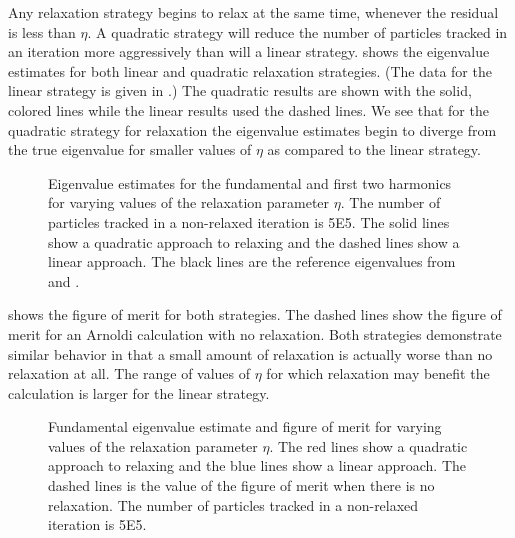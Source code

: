 Any relaxation strategy begins to relax at the same time, whenever the residual is less than $\eta$.  A quadratic strategy will reduce the number of particles tracked in an iteration more aggressively than will a linear strategy.   shows the eigenvalue estimates for both linear and quadratic relaxation strategies.  (The data for the linear strategy is given in .)  The quadratic results are shown with the solid, colored lines while the linear results used the dashed lines.  We see that for the quadratic strategy for relaxation the eigenvalue estimates begin to diverge from the true eigenvalue for smaller values of $\eta$ as compared to the linear strategy.  
\begin{sidewaysfigure}\centering
    
    \caption{Eigenvalue estimates for the fundamental and first two harmonics for varying values of the relaxation parameter $\eta$.  The number of particles tracked in a non-relaxed iteration is 5E5.  The solid lines show a quadratic approach to relaxing and the dashed lines show a linear approach.  The black lines are the reference eigenvalues from \cite{Garis:1991One-s-0} and \cite{Dahl:1979Eigen-0}.}
    \label{fig:MoreandLessValue}
\end{sidewaysfigure}

 shows the figure of merit for both strategies.  The dashed lines show the figure of merit for an Arnoldi calculation with no relaxation.  Both strategies demonstrate similar behavior in that a small amount of relaxation is actually worse than no relaxation at all.  The range of values of $\eta$ for which relaxation may benefit the calculation is larger for the linear strategy.  


\begin{sidewaysfigure}\centering
    
    \caption{Fundamental eigenvalue estimate and figure of merit for varying values of the relaxation parameter $\eta$.  The red lines show a quadratic approach to relaxing and the blue lines show a linear approach.  The dashed lines is the value of the figure of merit when there is no relaxation.  The number of particles tracked in a non-relaxed iteration is 5E5.}
    \label{fig:MoreandLessFOM}
\end{sidewaysfigure}

